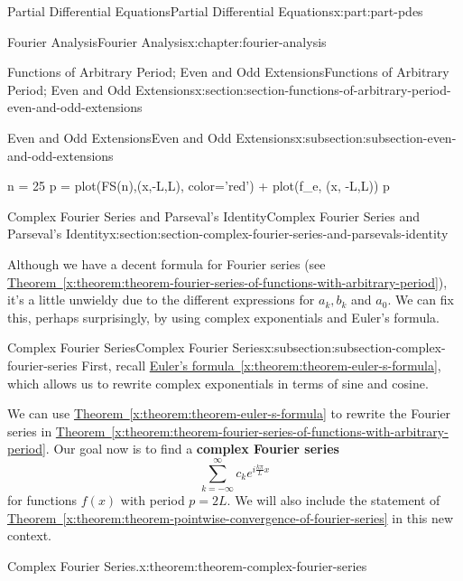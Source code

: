 \documentclass[oneside,10pt,]{book}
\newcommand{\xreffont}{\relax}
\newcommand{\terminology}[1]{\textbf{#1}}
\numberwithin{equation}{part}
\begin{document}
\begin{partptx}{Partial Differential Equations}{}{Partial Differential Equations}{}{}{x:part:part-pdes}
\begin{chapterptx}{Fourier Analysis}{}{Fourier Analysis}{}{}{x:chapter:fourier-analysis}
\begin{sectionptx}{Functions of Arbitrary Period; Even and Odd Extensions}{}{Functions of Arbitrary Period; Even and Odd Extensions}{}{}{x:section:section-functions-of-arbitrary-period-even-and-odd-extensions}
\begin{subsectionptx}{Even and Odd Extensions}{}{Even and Odd Extensions}{}{}{x:subsection:subsection-even-and-odd-extensions}
\begin{sageinput}
n = 25
p = plot(FS(n),(x,-L,L), color='red') + plot(f_e, (x, -L,L))
p
\end{sageinput}
\end{subsectionptx}
\end{sectionptx}
%
%
\typeout{************************************************}
\typeout{************************************************}
%
\begin{sectionptx}{Complex Fourier Series and Parseval's Identity}{}{Complex Fourier Series and Parseval's Identity}{}{}{x:section:section-complex-fourier-series-and-parsevals-identity}
\begin{introduction}{}%
Although we have a decent formula for Fourier series (see \hyperref[x:theorem:theorem-fourier-series-of-functions-with-arbitrary-period]{Theorem~{\xreffont\ref{x:theorem:theorem-fourier-series-of-functions-with-arbitrary-period}}}), it's a little unwieldy due to the different expressions for \(a_{k},b_{k}\) and \(a_{0}\). We can fix this, perhaps surprisingly, by using complex exponentials and Euler's formula.%
\end{introduction}%
%
%
\typeout{************************************************}
\typeout{************************************************}
%
\begin{subsectionptx}{Complex Fourier Series}{}{Complex Fourier Series}{}{}{x:subsection:subsection-complex-fourier-series}
First, recall \hyperref[x:theorem:theorem-euler-s-formula]{Euler's formula~{\xreffont\ref{x:theorem:theorem-euler-s-formula}}}, which allows us to rewrite complex exponentials in terms of sine and cosine.%
\par
We can use \hyperref[x:theorem:theorem-euler-s-formula]{Theorem~{\xreffont\ref{x:theorem:theorem-euler-s-formula}}} to rewrite the Fourier series in \hyperref[x:theorem:theorem-fourier-series-of-functions-with-arbitrary-period]{Theorem~{\xreffont\ref{x:theorem:theorem-fourier-series-of-functions-with-arbitrary-period}}}. Our goal now is to find a \terminology{complex Fourier series}%
\begin{equation*}
\sum_{k=-\infty}^{\infty}c_{k}e^{i\frac{k\pi}{L}x}
\end{equation*}
for functions \(f(x)\) with period \(p=2L\). We will also include the statement of \hyperref[x:theorem:theorem-pointwise-convergence-of-fourier-series]{Theorem~{\xreffont\ref{x:theorem:theorem-pointwise-convergence-of-fourier-series}}} in this new context.%
\begin{theorem}{Complex Fourier Series.}{}{x:theorem:theorem-complex-fourier-series}%

\end{theorem}
\end{subsectionptx}
\end{sectionptx}
\end{chapterptx}
\end{partptx}
\end{document}
